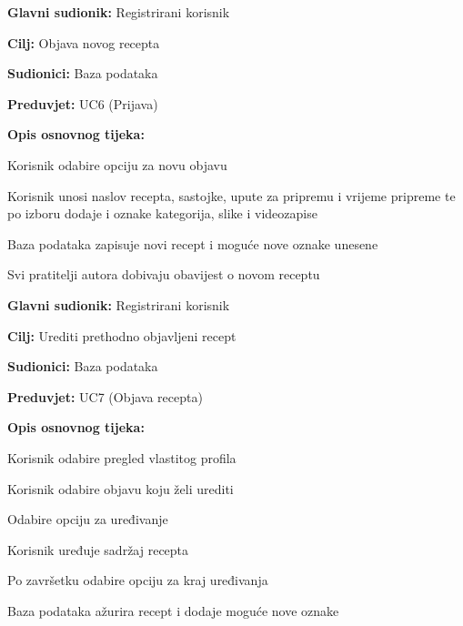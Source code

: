 					\noindent {}
					\begin{packed_item}
						
						\item \textbf{Glavni sudionik: }Registrirani korisnik
						\item \textbf{Cilj: }Objava novog recepta
						\item \textbf{Sudionici: }Baza podataka
						\item \textbf{Preduvjet: }UC6 (Prijava)
						\item \textbf{Opis osnovnog tijeka:}
						
						\item[] \begin{packed_enum}
							\item Korisnik odabire opciju za novu objavu
							\item Korisnik unosi naslov recepta, sastojke, upute za pripremu i vrijeme pripreme te po izboru dodaje i oznake kategorija, slike i videozapise
							\item Baza podataka zapisuje novi recept i moguće nove oznake unesene
							\item Svi pratitelji autora dobivaju obavijest o novom receptu
						\end{packed_enum}
					\end{packed_item}
					
					\noindent \underbar{\textbf{UC8 - Uređivanje objave}}
					\begin{packed_item}
						
						\item \textbf{Glavni sudionik: }Registrirani korisnik
						\item \textbf{Cilj: }Urediti prethodno objavljeni recept
						\item \textbf{Sudionici: }Baza podataka
						\item \textbf{Preduvjet: }UC7 (Objava recepta)
						\item \textbf{Opis osnovnog tijeka:}
						
						\item[] \begin{packed_enum}
							\item Korisnik odabire pregled vlastitog profila
							\item Korisnik odabire objavu koju želi urediti
							\item Odabire opciju za uređivanje
							\item Korisnik uređuje sadržaj recepta
							\item Po završetku odabire opciju za kraj uređivanja
							\item Baza podataka ažurira recept i dodaje moguće nove oznake
						\end{packed_enum}
					\end{packed_item}
					

